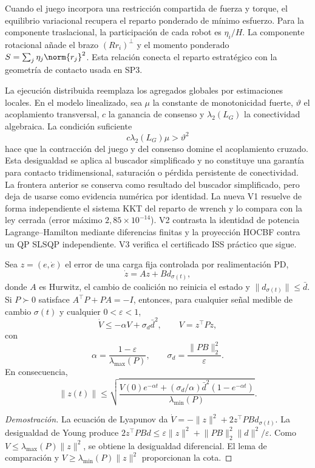 Cuando el juego incorpora una restricción compartida de fuerza y torque, el equilibrio
variacional recupera el reparto ponderado de mínimo esfuerzo. Para la componente
traslacional, la participación de cada robot es $\eta_i/H$. La componente rotacional
añade el brazo $(Rr_i)^\perp$ y el momento ponderado
$S=\sum_j\eta_j\norm{r_j}^2$. Esta relación conecta el reparto estratégico con la
geometría de contacto usada en SP3.

La ejecución distribuida reemplaza los agregados globales por estimaciones locales. En
el modelo linealizado, sea $\mu$ la constante de monotonicidad fuerte, $\vartheta$ el
acoplamiento transversal, $c$ la ganancia de consenso y $\lambda_2(L_G)$ la conectividad
algebraica. La condición suficiente
\[
 c\lambda_2(L_G)\mu>\vartheta^2
\]
hace que la contracción del juego y del consenso domine el acoplamiento cruzado. Esta
desigualdad se aplica al buscador simplificado y no constituye una garantía para contacto
tridimensional, saturación o pérdida persistente de conectividad. La frontera anterior se conserva como resultado del buscador simplificado, pero deja de usarse como evidencia numérica por identidad. La nueva V1 resuelve de forma independiente el sistema KKT del reparto de wrench y lo compara con la ley cerrada (error máximo $2{,}85\times10^{-14}$). V2 contrasta la identidad de potencia Lagrange--Hamilton mediante diferencias finitas y la proyección HOCBF contra un QP SLSQP independiente. V3 verifica el certificado ISS práctico que sigue.

\begin{teorema}
\label{thm:iss-practica-coalicion}
Sea $z=(e,\dot e)$ el error de una carga fija controlada por realimentación PD,
\[
 \dot z=Az+B d_{\sigma(t)},
\]
donde $A$ es Hurwitz, el cambio de coalición no reinicia el estado y $\lVert d_{\sigma(t)}\rVert\leq\bar d$. Si $P\succ0$ satisface $A^\top P+PA=-I$, entonces, para cualquier señal medible de cambio $\sigma(t)$ y cualquier $0<\varepsilon<1$,
\[
 \dot V\leq-\alpha V+\sigma_d\bar d^2,
 \qquad V=z^\top Pz,
\]
con
\[
 \alpha=\frac{1-\varepsilon}{\lambda_{\max}(P)},
 \qquad
 \sigma_d=\frac{\lVert PB\rVert_2^2}{\varepsilon}.
\]
En consecuencia,
\[
 \lVert z(t)\rVert
 \leq
 \sqrt{\frac{V(0)e^{-\alpha t}+(\sigma_d/\alpha)\bar d^2(1-e^{-\alpha t})}{\lambda_{\min}(P)}}.
\]
\end{teorema}

\begin{proof}[Demostración]
La ecuación de Lyapunov da $\dot V=-\lVert z\rVert^2+2z^\top PBd_{\sigma(t)}$. La desigualdad de Young produce $2z^\top PBd\leq\varepsilon\lVert z\rVert^2+\lVert PB\rVert_2^2\lVert d\rVert^2/\varepsilon$. Como $V\leq\lambda_{\max}(P)\lVert z\rVert^2$, se obtiene la desigualdad diferencial. El lema de comparación y $V\geq\lambda_{\min}(P)\lVert z\rVert^2$ proporcionan la cota.
\end{proof}

